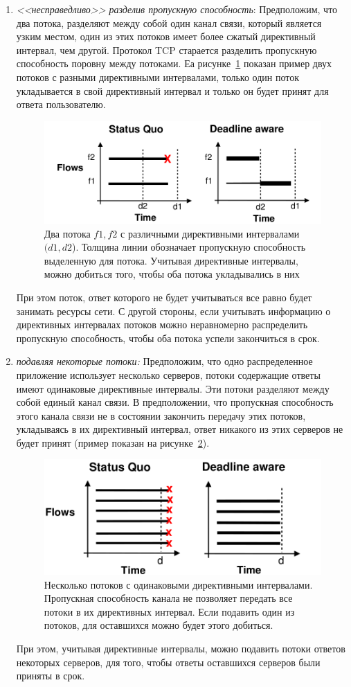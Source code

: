 \documentclass[14pt, a4paper,oneside]{extarticle}
\begin{document}
\begin{enumerate}
\item \emph{<<несправедливо>> разделив пропускную способность}: 
Предположим, что два потока, разделяют между собой один канал связи, который является узким местом, один из этих потоков имеет более сжатый директивный интервал, чем другой. Протокол TCP старается разделить пропускную способность поровну между потоками. Еа рисунке~\ref{fairness_two_flow} показан пример двух потоков с разными директивными интервалами, только один поток укладывается в свой директивный интервал и только он будет принят для ответа пользователю. 
\begin{figure}
	\includegraphics[width=0.7\linewidth]{fairness_two_flow}
	\caption{Два потока $f1, f2$ с различными директивными интервалами $(d1, d2$). Толщина линии обозначает пропускную способность выделенную для потока. Учитывая директивные интервалы, можно добиться того, чтобы оба потока укладывались в них}
	\label{fairness_two_flow}
\end{figure}
При этом поток, ответ которого не будет учитываться все равно будет занимать ресурсы сети. С другой стороны, если учитывать информацию о директивных интервалах потоков можно неравномерно распределить пропускную способность, чтобы оба потока успели закончиться в срок.

\item \emph{подавляя некоторые потоки:}
Предположим, что одно распределенное приложение использует несколько серверов, потоки содержащие ответы имеют одинаковые директивные интервалы. Эти потоки разделяют между собой единый канал связи. В предположении, что пропускная способность этого канала связи не в состоянии закончить передачу этих потоков, укладываясь в их директивный интервал, ответ никакого из этих серверов не будет принят (пример показан на рисунке~\ref{fairness_many_flows}).
\begin{figure}
	\includegraphics[width=0.7\linewidth]{fairness_many_flows}
	\caption{Несколько потоков с одинаковыми директивными интервалами. Пропускная способность канала не позволяет передать все потоки в их директивных интервал. Если подавить один из потоков, для оставшихся можно будет этого добиться.}
	\label{fairness_many_flows}
\end{figure}
При этом, учитывая директивные интервалы, можно подавить потоки ответов некоторых серверов, для того, чтобы ответы оставшихся серверов были приняты в срок.
\end{enumerate}
\end{document}
